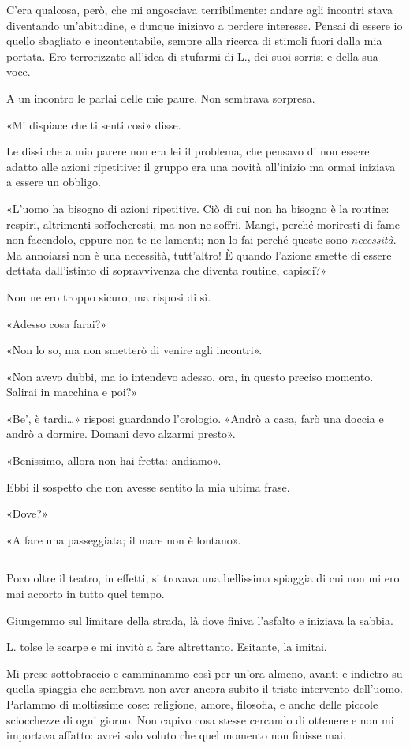 \documentclass[a4paper,10pt]{memoir}
\begin{document}
C'era qualcosa, però, che mi angosciava terribilmente: andare agli incontri stava diventando un'abitudine, e dunque
iniziavo a perdere interesse. Pensai di essere io quello sbagliato e incontentabile, sempre alla ricerca di stimoli
fuori dalla mia portata. Ero terrorizzato all'idea di stufarmi di L., dei suoi sorrisi e della sua voce.

A un incontro le parlai delle mie paure. Non sembrava sorpresa.

«Mi dispiace che ti senti così» disse.

Le dissi che a mio parere non era lei il problema, che pensavo di non essere adatto alle azioni ripetitive: il gruppo
era una novità all'inizio ma ormai iniziava a essere un obbligo.

«L'uomo ha bisogno di azioni ripetitive. Ciò di cui non ha bisogno è la routine: respiri, altrimenti soffocheresti, ma
non ne soffri. Mangi, perché moriresti di fame non facendolo, eppure non te ne lamenti; non lo fai perché queste sono
\emph{necessità}. Ma annoiarsi non è una necessità, tutt'altro! È quando l'azione smette di essere dettata dall'istinto
di sopravvivenza che diventa routine, capisci?»

Non ne ero troppo sicuro, ma risposi di sì.

«Adesso cosa farai?»

«Non lo so, ma non smetterò di venire agli incontri».

«Non avevo dubbi, ma io intendevo adesso, ora, in questo preciso momento. Salirai in macchina e poi?»

«Be', è tardi\dots{}»  risposi guardando l'orologio. «Andrò a casa, farò una doccia e andrò a dormire. Domani devo
alzarmi presto».

«Benissimo, allora non hai fretta: andiamo».

Ebbi il sospetto che non avesse sentito la mia ultima frase.

«Dove?»

«A fare una passeggiata; il mare non è lontano».

\plainbreak{1}

Poco oltre il teatro, in effetti, si trovava una bellissima spiaggia di cui non mi ero mai accorto in tutto quel tempo.

Giungemmo sul limitare della strada, là dove finiva l'asfalto e iniziava la sabbia.

L. tolse le scarpe e mi invitò a fare altrettanto. Esitante, la imitai.

Mi prese sottobraccio e camminammo così per un'ora almeno, avanti e indietro su quella spiaggia che sembrava non aver
ancora subito il triste intervento dell'uomo. Parlammo di moltissime cose: religione, amore, filosofia, e anche delle
piccole sciocchezze di ogni giorno. Non capivo cosa stesse cercando di ottenere e non mi importava affatto: avrei solo
voluto che quel momento non finisse mai.
\end{document}
